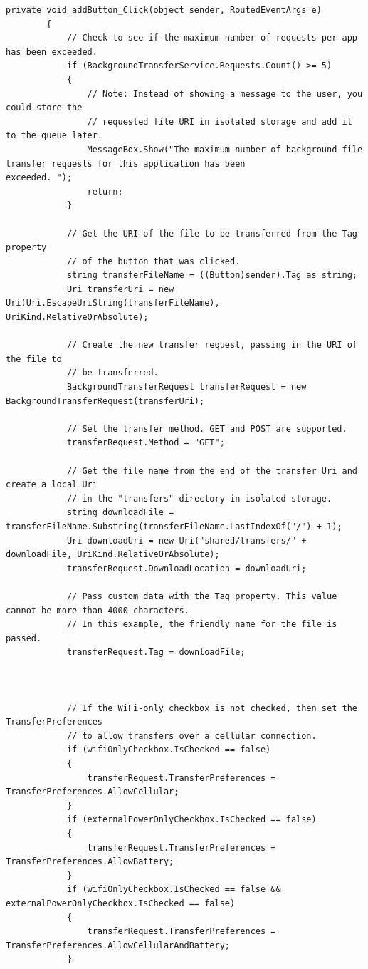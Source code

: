 \documentclass[a4paper,10pt]{scrreprt}
\begin{document}
\begin{lstlisting}[caption=Background File Transfer]
        private void addButton_Click(object sender, RoutedEventArgs e) 
        { 
            // Check to see if the maximum number of requests per app has been exceeded. 
            if (BackgroundTransferService.Requests.Count() >= 5) 
            { 
                // Note: Instead of showing a message to the user, you could store the 
                // requested file URI in isolated storage and add it to the queue later. 
                MessageBox.Show("The maximum number of background file transfer requests for this application has been 
exceeded. "); 
                return; 
            } 
 
            // Get the URI of the file to be transferred from the Tag property 
            // of the button that was clicked. 
            string transferFileName = ((Button)sender).Tag as string; 
            Uri transferUri = new Uri(Uri.EscapeUriString(transferFileName), UriKind.RelativeOrAbsolute); 
 
            // Create the new transfer request, passing in the URI of the file to  
            // be transferred. 
            BackgroundTransferRequest transferRequest = new BackgroundTransferRequest(transferUri); 
 
            // Set the transfer method. GET and POST are supported. 
            transferRequest.Method = "GET"; 
 
            // Get the file name from the end of the transfer Uri and create a local Uri  
            // in the "transfers" directory in isolated storage. 
            string downloadFile = transferFileName.Substring(transferFileName.LastIndexOf("/") + 1); 
            Uri downloadUri = new Uri("shared/transfers/" + downloadFile, UriKind.RelativeOrAbsolute); 
            transferRequest.DownloadLocation = downloadUri; 
 
            // Pass custom data with the Tag property. This value cannot be more than 4000 characters. 
            // In this example, the friendly name for the file is passed.  
            transferRequest.Tag = downloadFile; 
 
 
 
            // If the WiFi-only checkbox is not checked, then set the TransferPreferences 
            // to allow transfers over a cellular connection. 
            if (wifiOnlyCheckbox.IsChecked == false) 
            { 
                transferRequest.TransferPreferences = TransferPreferences.AllowCellular; 
            } 
            if (externalPowerOnlyCheckbox.IsChecked == false) 
            { 
                transferRequest.TransferPreferences = TransferPreferences.AllowBattery; 
            } 
            if (wifiOnlyCheckbox.IsChecked == false && externalPowerOnlyCheckbox.IsChecked == false) 
            { 
                transferRequest.TransferPreferences = TransferPreferences.AllowCellularAndBattery; 
            } 
 

\end{lstlisting}
\end{document}
